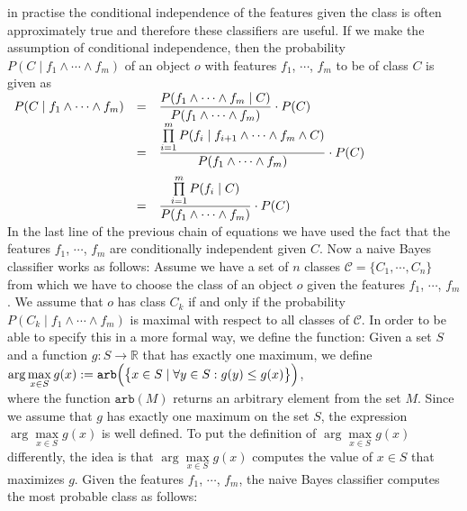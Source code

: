 in practise the conditional independence of the features given 
the class is often approximately true and therefore these classifiers are useful.  If we make the
assumption of conditional independence, then the probability $P(C\;|\; f_1 \wedge \cdots \wedge f_m)$ of an
object $o$ with features $f_1$, $\cdots$, $f_m$ to be of class $C$ is given as
\\[0.2cm]
\hspace*{1.3cm}
$
\begin{array}[t]{lcll}
      P(C\;|\; f_1 \wedge \cdots \wedge f_m) 
& = & \displaystyle \frac{P(f_1 \wedge \cdots \wedge f_m \;|\; C)}{P(f_1 \wedge \cdots \wedge f_m)} \cdot P(C) \\[0.2cm]
& = & \displaystyle \frac{\prod\limits_{i=1}^m P(f_i \;|\; f_{i+1} \wedge \cdots \wedge f_m \wedge C)}{P(f_1 \wedge \cdots \wedge f_m)} \cdot P(C) \\[0.4cm]
& = & \displaystyle \frac{\prod\limits_{i=1}^m P(f_i \;|\; C)}{P(f_1 \wedge \cdots \wedge f_m)} \cdot P(C) 
\end{array}
$
\\[0.2cm]
In the last line of the previous chain of equations we have used the fact that the features $f_1$, $\cdots$,
$f_m$ are conditionally independent given $C$.  Now a naive Bayes classifier works as follows: 
Assume we have a set of $n$ classes $\mathcal{C} = \{ C_1, \cdots, C_n \}$ from which we have to choose the
class of an object $o$ given the features  $f_1$, $\cdots$, $f_m$.  We assume that $o$ has class $C_k$ if
and only if the probability $P(C_k\;|\; f_1 \wedge \cdots \wedge f_m)$ is maximal with respect to all classes
of $\mathcal{C}$.  In order to be able to specify this in a more formal
way, we define the \blue{$\arg\max$} function: Given a set $S$ and a function $g:S \rightarrow \mathbb{R}$ that has
exactly one maximum, we define
\\[0.2cm]
\hspace*{1.3cm}
$\arg\max\limits_{x \in S} g(x) := \texttt{arb}\Bigl(\bigl\{ x \in S \mid \forall y \in S: g(y) \leq g(x)\bigr\}\Bigr)$,
\\[0.2cm]
where the function $\texttt{arb}(M)$ returns an arbitrary element from the set $M$. 
Since we assume that $g$ has exactly one maximum on the set $S$, the expression 
$\arg\max\limits_{x \in S} g(x)$ is well defined.  To
put the definition of  $\arg\max\limits_{x \in S} g(x)$ differently, the idea is that
$\arg\max\limits_{x \in S} g(x)$ computes the value of $x \in S$ that maximizes $g$.  Given the features  $f_1$, $\cdots$,
$f_m$, the naive Bayes classifier computes the most probable class as follows:
